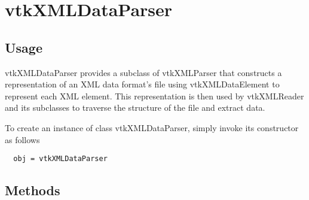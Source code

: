 \section{vtkXMLDataParser}

\subsection{Usage}

 vtkXMLDataParser provides a subclass of vtkXMLParser that
 constructs a representation of an XML data format's file using
 vtkXMLDataElement to represent each XML element.  This
 representation is then used by vtkXMLReader and its subclasses to
 traverse the structure of the file and extract data.

To create an instance of class vtkXMLDataParser, simply
invoke its constructor as follows
\begin{verbatim}
  obj = vtkXMLDataParser
\end{verbatim}
\subsection{Methods}

